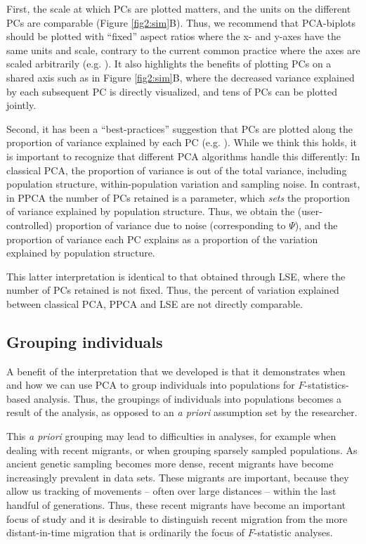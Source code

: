 \documentclass[12pt, letterpaper]{article}
\begin{document}
First, the scale at which PCs are plotted matters, and the units on the different PCs are comparable (Figure \ref{fig2:sim}B). Thus, we recommend that PCA-biplots should be plotted with ``fixed'' aspect ratios where the x- and y-axes have the same units and scale, contrary to the current common practice where the axes are scaled arbitrarily (e.g. \cite{novembre_genes_2008, peter_genetic_2020}). It also highlights the benefits of plotting PCs on a shared axis  such as in Figure \ref{fig2:sim}B, where the decreased variance explained by each subsequent PC is directly visualized, and tens of PCs can be plotted jointly.

Second, it has been a ``best-practices'' suggestion that PCs are plotted along the proportion of variance explained by each PC (e.g. ). While we think this holds, it is important to recognize that different PCA algorithms handle this differently: In classical PCA, the proportion of variance is out of the total variance, including population structure, within-population variation and sampling noise. In contrast, in PPCA the number of PCs retained is a parameter, which \emph{sets} the proportion of variance explained by population structure. Thus, we obtain the (user-controlled) proportion of variance due to noise (corresponding to $\Psi$), and the proportion of variance each PC explains as a proportion of the variation explained by population structure. 

This latter interpretation is identical to that obtained through LSE, where the number of PCs retained is not fixed. Thus, the percent of variation explained between classical PCA, PPCA and LSE are not directly comparable.

\subsection{Grouping individuals}
A benefit of the interpretation that we developed is that it demonstrates when and how we can use PCA to group individuals into  populations for $F$-statistics-based analysis. 
Thus, the groupings of individuals into populations becomes a result of the analysis, as opposed to an \textit{a priori} assumption set by the researcher.

This \textit{a priori} grouping may lead to difficulties in analyses, for example when dealing with recent migrants, or when grouping sparsely sampled populations. As ancient genetic sampling becomes more dense, recent migrants have become increasingly prevalent in data sets. These migrants are important, because they allow us tracking of movements -- often over large distances -- within the last handful of generations. Thus, these recent migrants have become an important focus of study and it is desirable to distinguish recent migration from the more distant-in-time migration that is ordinarily the focus of $F$-statistic analyses.
\end{document}
